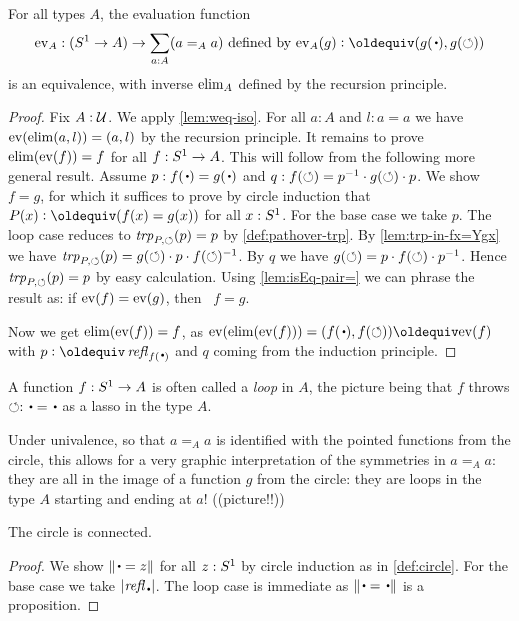 \begin{lemma}\label{lem:freeloopspace}
For all types $A$, the evaluation function 
\[
\ev_A : (\Sc\to A)\to \sum_{a:A}(a=_Aa)\text{~defined by~} 
\ev_A(g)\defeq (g(\base),g(\Sloop))
\]
is an equivalence, with inverse $\mathrm{elim}_A$ defined by the recursion principle.  
\end{lemma}
\begin{proof}
Fix $A:\mathcal{U}$. We apply \cref{lem:weq-iso}. 
For all $a:A$ and $l:a=a$ we have $\mathrm{ev}(\mathrm{elim}(a,l))=(a,l)$
by the recursion principle. It remains to prove
$\mathrm{elim}(\mathrm{ev}(f))=f$ for all $f:{S^1}\to A$. This will follow
from the following more general result. Assume 
$p: f(\base)= g(\base)$ and $q: f(\circlearrowleft) = p^{-1}\cdot g(\circlearrowleft)\cdot p$.
We show $f=g$, for which it suffices to prove by circle induction
that $P(x)\defeq(f(x)=g(x))$ for all $x:{S^1}$.
For the base case we take $p$.
The loop case reduces to $\mathop{\mathit{trp}_{P,\circlearrowleft}}(p)=p$ by \cref{def:pathover-trp}.
By \cref{lem:trp-in-fx=Ygx} we have 
$\mathop{\mathit{trp}_{P,\circlearrowleft}}(p)=g(\circlearrowleft)\cdot p \cdot f(\circlearrowleft)^{-1}$. 
By $q$ we have $g(\circlearrowleft) = p\cdot f(\circlearrowleft) \cdot p^{-1}$.
Hence $\mathop{\mathit{trp}_{P,\circlearrowleft}}(p)=p$ by easy calculation.
Using \cref{lem:isEq-pair=} we can phrase the result
as: if $\mathrm{ev}(f)=\mathrm{ev}(g)$, then  $f=g$.

Now we get $\mathrm{elim}(\mathrm{ev}(f))=f$, as
$\ev(\el(\ev(f)))=(f(\base),f(\Sloop))\jdeq\ev(f)$ with $p\defeq\refl{f(\base)}$
and $q$ coming from the induction principle.
\end{proof}

\begin{remark}
A function $f:{S^1}\to A$ is often called a \emph{loop} in $A$, 
the picture being that $f$ throws $\Sloop:\base=\base$ as a lasso in the type $A$.

  Under univalence, so that $a=_Aa$ is identified with the pointed functions 
from the circle, this allows for a very graphic interpretation of the 
symmetries in $a=_Aa$: they are all in the image of a function $g$ from 
the circle: they are loops in the type $A$ starting and ending at $a$! ((picture!!))
\end{remark}

\begin{lemma}\label{lem:circleisconnected}
  The circle is connected.
\end{lemma}
\begin{proof}
We show $\Trunc{\base=z}$ for all $z:{S^1}$ by circle induction
as in \cref{def:circle}.
For the base case we take $\trunc{\refl{\base}}$.
The loop case is immediate as $\Trunc{\base=\base}$ is a proposition.
\end{proof}

